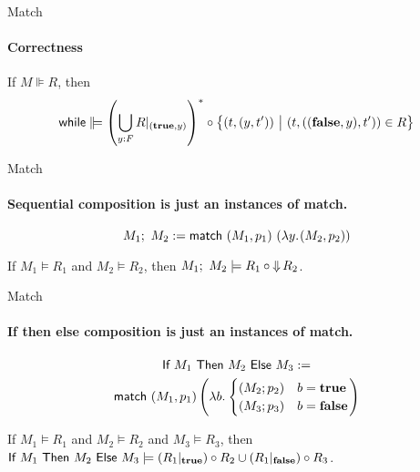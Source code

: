\begin{frame}{Match}
  \framesubtitle{Correctness}
  \begin{lemma}
    \label{lem:while-wrealise}
    If $M \VDash R$, then
    $$ \MS{while} \VDash
    \left( \bigcup_{y:F} R\at{(\true, y)} \right)^* \circ
    \setMap{(t, (y, t'))}{(t,((\false, y), t')) \in R}
    $$
  \end{lemma}
\end{frame}

\begin{frame}{Match}
  \framesubtitle{Sequential composition is just an instances of match.}
  \begin{definition}
    $$M_1 ;~ M_2 := \textsf{match}~(M_1, p_1)~(\lambda y{.}\hskip.7pt(M_2, p_2))$$
  \end{definition}

  \begin{corollary}
    If $M_1 \vDash R_1$ and $M_2 \vDash R_2$, then $M_1 ;~ M_2 \models R_1 \circ \operatorname{\Downarrow} R_2$.
  \end{corollary}
\end{frame}

\begin{frame}{Match}
  \framesubtitle{If then else composition is just an instances of match.}
  \begin{definition}[Boolean if]
    \begin{multline*}
      \textsf{If}~M_1~\textsf{Then}~M_2~\textsf{Else}~M_3 := \\
      \textsf{match}~(M_1, p_1) \left(\lambda b{.}\hskip.7pt\begin{cases} (M_2; p_2) & b = \mathbf{true} \\ (M_3; p_3) & b = \mathbf{false} \end{cases} \right)
    \end{multline*}
  \end{definition}

  \begin{corollary}
    If $M_1 \vDash R_1$ and $M_2 \vDash R_2$ and $M_3 \vDash R_3$, then
    $\textsf{If}~M_1~\textsf{Then}~M_2~\textsf{Else}~M_3 \models (R_1 |_{\mathbf{true}}) \circ R_2 \cup (R_1 |_{\mathbf{false}}) \circ R_3$.
  \end{corollary}
\end{frame}

